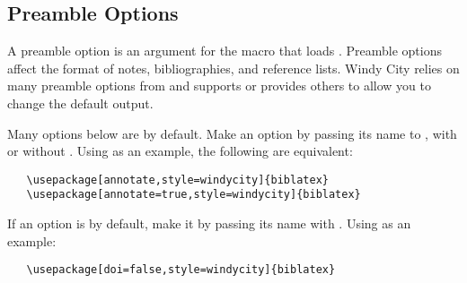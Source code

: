\documentclass[11pt,letterpaper,oneside]{article}
\begin{document}
\subsection{Preamble Options}
\label{preamble}

A preamble option is an argument for the  macro that
loads \biblatex. Preamble options affect the format of notes,
bibliographies, and reference lists. Windy City relies on many
preamble options from \biblatex and supports or provides others to
allow you to change the default output.


Many options below are  by default. Make an option
 by passing its name to \biblatex, with or without
. Using  as an example, the following are
equivalent:

\begin{verbatim}
   \usepackage[annotate,style=windycity]{biblatex}
   \usepackage[annotate=true,style=windycity]{biblatex}
\end{verbatim}

If an option is  by default, make it  by passing
its name with . Using  as an example:

\begin{verbatim}
   \usepackage[doi=false,style=windycity]{biblatex}
\end{verbatim}
\end{document}

